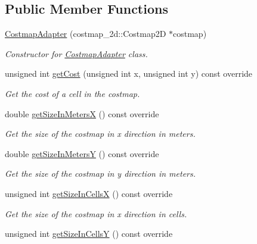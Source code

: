 \subsection*{Public Member Functions}
\begin{DoxyCompactItemize}
\item 
\hyperlink{classquadtree__planner_1_1CostmapAdapter_a3efe5b09f0fc3c5f3c0df1557854a8d7}{Costmap\+Adapter} (costmap\+\_\+2d\+::\+Costmap2D $\ast$costmap)
\begin{DoxyCompactList}\small\item\em Constructor for \hyperlink{classquadtree__planner_1_1CostmapAdapter}{Costmap\+Adapter} class. \end{DoxyCompactList}\item 
unsigned int \hyperlink{classquadtree__planner_1_1CostmapAdapter_af5b15c508adabc428aabde14253c9468}{get\+Cost} (unsigned int x, unsigned int y) const override
\begin{DoxyCompactList}\small\item\em Get the cost of a cell in the costmap. \end{DoxyCompactList}\item 
double \hyperlink{classquadtree__planner_1_1CostmapAdapter_a360c5f4047437c2fb69b91e598e0aecf}{get\+Size\+In\+MetersX} () const override
\begin{DoxyCompactList}\small\item\em Get the size of the costmap in x direction in meters. \end{DoxyCompactList}\item 
double \hyperlink{classquadtree__planner_1_1CostmapAdapter_aa253651d1b4596009ca26009e7ad28f8}{get\+Size\+In\+MetersY} () const override
\begin{DoxyCompactList}\small\item\em Get the size of the costmap in y direction in meters. \end{DoxyCompactList}\item 
unsigned int \hyperlink{classquadtree__planner_1_1CostmapAdapter_a376b9bddbf47474be992170d06e008d7}{get\+Size\+In\+CellsX} () const override
\begin{DoxyCompactList}\small\item\em Get the size of the costmap in x direction in cells. \end{DoxyCompactList}\item 
unsigned int \hyperlink{classquadtree__planner_1_1CostmapAdapter_a7d54b4b74b3057018408550c1116066e}{get\+Size\+In\+CellsY} () const override

\end{DoxyCompactItemize}
